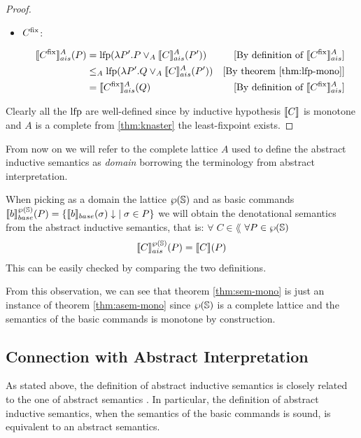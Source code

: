\documentclass[
  10pt,       %
  twoside,    %
  a4paper,    %
  english,    %
  tikz,       %
  openright,  %
]{book}
\begin{document}
\begin{proof}
\begin{itemize}
    \item $C^\fix$:

      \begin{align*}
        \asem{C^\fix}(P) 
          &= \lfp(\lambda P'. P \join_A \asem{C}(P'))
          &\text{[By definition of $\asem{C^\fix}$]}\\
          &\leq_A \lfp(\lambda P'. Q \join_A \asem{C}(P'))
          &\text{[By theorem \ref{thm:lfp-mono}]}\\
          &= \asem{C^\fix}(Q) 
          &\text{[By definition of $\asem{C^\fix}$]}\\
      \end{align*}
  \end{itemize}


  Clearly all the $\lfp$ are well-defined since by inductive hypothesis
  $\sem{C}$ is monotone and $A$ is a complete from 
  \ref{thm:knaster} the least-fixpoint exists.
\end{proof}

From now on we will refer to the complete lattice $A$ used to define the abstract
inductive semantics as \textit{domain} borrowing the terminology from abstract
interpretation.

\begin{observation}
  \label{obs:post}
  When picking as a domain the lattice $\pow{\states}$ and as basic commands
  $\bsem{b}^{\pow{\states}}(P) = \{ \bsem{b}(\sigma)\downarrow \; \mid \sigma 
  \in P \}$ we will obtain the denotational semantics from the 
  abstract inductive semantics, that is: $\forall \; C \in \lang$ $\forall P \in 
  \pow{\states}$ 
  $$\asem[\pow{\states}]{C}(P) = \sem{C}(P)$$
  This can be easily checked by comparing the two definitions.
\end{observation}

From this observation, we can see that theorem \ref{thm:sem-mono} is just an
instance of theorem \ref{thm:asem-mono} since $\pow{\states}$ is a
complete lattice and the semantics of the basic commands is monotone by
construction.

\subsection{Connection with Abstract Interpretation}

As stated above, the definition of abstract inductive semantics is closely
related to the one of abstract semantics \cite{Cousot77}. In particular, the 
definition of abstract inductive semantics, when the semantics of the basic
commands is sound, is equivalent to an abstract semantics.
\end{document}
